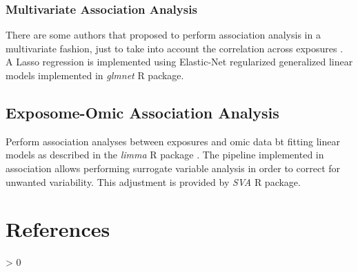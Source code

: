 \documentclass[
]{book}
\newlength{\cslhangindent}
\newenvironment{CSLReferences}[2] %
 {%
  \setlength{\parindent}{0pt}
  \ifodd #1 \everypar{\setlength{\hangindent}{\cslhangindent}}\ignorespaces\fi
  \ifnum #2 > 0
  \setlength{\parskip}{#2\baselineskip}
  \fi
 }%
 {}
\begin{document}
\hypertarget{multivariate-association-analysis}{%
\subsection{Multivariate Association Analysis}\label{multivariate-association-analysis}}

There are some authors that proposed to perform association analysis in a multivariate fashion, just to take into account the correlation across exposures \citet{agier2016systematic} . A Lasso regression is implemented using Elastic-Net regularized generalized linear models implemented in \emph{glmnet} R package.

\hypertarget{exposome-omic-association-analysis}{%
\section{Exposome-Omic Association Analysis}\label{exposome-omic-association-analysis}}

Perform association analyses between exposures and omic data bt fitting linear models as described in the \emph{limma} R package \citet{ritchie2015limma} . The pipeline implemented in association allows performing surrogate variable analysis in order to correct for unwanted variability. This adjustment is provided by \emph{SVA} R package.

\hypertarget{references}{%
\chapter{References}\label{references}}

\hypertarget{refs}{}
\begin{CSLReferences}{0}{0}
\end{CSLReferences}

  
\end{document}
